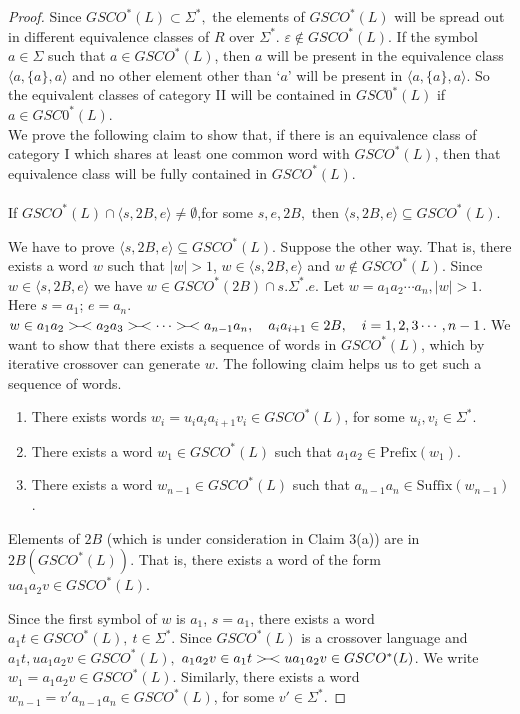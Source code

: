 \documentclass{llncs}
\newcommand{\ve}{\varepsilon}
\newcommand{\p}{\mathrm{Prefix}}
\newcommand{\s}{\mathrm{Suffix}}
\newcommand{\ers}{>\hspace{-2mm}-\hspace{-2mm}<}
\begin{document}
\begin{proof}
\par Since $ GSCO^*(L) \subset  \Sigma^*,$ the elements of $GSCO^*(L)$
will be spread out in different equivalence classes of $R$ over
$\Sigma^*$.  $\ve \notin GSCO^*(L)$.  If the symbol $a \in
 \Sigma$ such that   $a \in GSCO^*(L)$, then $a$  will be present in the
equivalence class $\langle a, \{a\},a \rangle $ and no other element
other than `$a$' will be present in $\langle a, \{a\},a \rangle $.
So the equivalent classes of category II will be contained in
$GSC0^*(L)$ if $a\in GSC0^*(L)$.\\


We prove the following claim to show  that, if there is an
equivalence class of category I which shares at least one common
word with $GSCO^*(L)$, then that equivalence class will be fully
contained in $GSCO^*(L)$.\\
\\
 If $GSCO^*(L) \cap \langle
s,2B,e\rangle \neq \emptyset  $,for some $s, e, 2B,  $ then $\langle
s, 2B, e\rangle \subseteq GSCO^*(L).  $
\par  We have to prove $\langle s, 2B,
e\rangle \subseteq GSCO^*(L).  $ Suppose the other way. That is,
there exists a word $w$ such that $|w| >  1 $, $w \in \langle s, 2B,
e\rangle  $ and $ w \notin GSCO^*(L)$. Since $w \in \langle s, 2B,
e\rangle  $ we have  $w \in GSCO^*(2B) \cap s.\Sigma^*.e$.  Let $w =
a_1a_2 \cdots a_{n}, |w|>1.$ Here $s = a_1$; $e = a_n$. $ w \in
a_1a_2\ers a_2a_3\ers \cdots
 \ers a_{n-1}a_{n},  ~~~ a_ia_{i+1} \in 2B, ~~~ i =
 1,2,3\cdots,n-1$. We want to show that there exists a sequence of
 words in $GSCO^*(L)$, which by iterative crossover can generate $w$. The
 following claim helps us to get such a sequence of words.
\\

\begin{enumerate}
\item There
exists words $w_i = u_ia_ia_{i+1}v_i \in GSCO^*(L)$, for some $u_i
,v_i \in
 \Sigma^*$.
 \item There exists a word $w_1 \in  GSCO^*(L)$ such
that $a_1a_2 \in \p(w_1) $.
\item There exists a word $w_{n-1} \in
GSCO^*(L)$ such that $a_{n-1}a_n \in \s(w_{n-1})$.

\end{enumerate}
\par Elements of $2B $ (which is under consideration in Claim 3(a)) are
in $2B(GSCO^*(L))$.  That is, there exists a word of the form
$ua_1a_2v \in  GSCO^*(L)$.
\par
Since the first symbol of $w$ is $a_1$, $s = a_1$, there exists a
word $a_1t \in GSCO^*(L), ~t \in \Sigma^*$. Since $GSCO^*(L)$ is a
crossover language and $a_1t,ua_1a_2v \in GSCO^*(L),$ $a_1a_2v \in
a_1t \ers ua_1a_2v \in GSCO^*(L)$.  We write $w_1 = a_1a_2v \in
GSCO^*(L)$. Similarly, there exists a word $w_{n-1} = v'a_{n-1}a_n
\in GSCO^*(L)$, for some $v' \in \Sigma^*$.


\end{proof}
\end{document}
